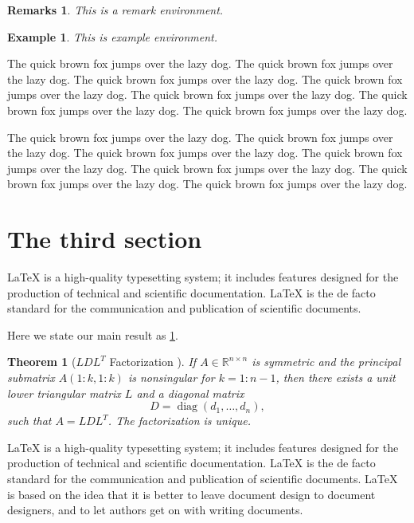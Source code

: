 \documentclass[openany,twoside,12pt]{book}
\theoremstyle{plain}
\newtheorem{theorem}{Theorem}[chapter]
\newtheorem{example}{Example}[chapter]
\newtheorem{remark}{Remarks}[chapter]
\numberwithin{equation}{chapter}
\numberwithin{figure}{chapter}
\numberwithin{table}{chapter}
\begin{document}
\begin{remark}
  This is a remark environment.
\end{remark}

\begin{example}
  This is example environment.
\end{example}

The quick brown fox jumps over the lazy dog. The quick brown fox jumps over the lazy dog. The quick brown fox jumps over the lazy dog. The quick brown fox jumps over the lazy dog. The quick brown fox jumps over the lazy dog. The quick brown fox jumps over the lazy dog. The quick brown fox jumps over the lazy dog.

The quick brown fox jumps over the lazy dog. The quick brown fox jumps over the lazy dog. The quick brown fox jumps over the lazy dog. The quick brown fox jumps over the lazy dog. The quick brown fox jumps over the lazy dog. The quick brown fox jumps over the lazy dog. The quick brown fox jumps over the lazy dog.


\section{The third section}
LaTeX is a high-quality typesetting system; it includes features designed for the production of technical and scientific documentation. LaTeX is the de facto standard for the communication and publication of scientific documents.

Here we state our main result as \ref{thm:bigthm}.

\begin{theorem}[$LDL^T$ Factorization \cite{GoVa2013}]\label{thm:bigthm}
  If $A \in \mathbb{R}^{n \times n}$ is symmetric and the principal
  submatrix $A(1:k,1:k)$ is nonsingular for $k=1:n-1$, then there
  exists a unit lower triangular matrix $L$ and a diagonal matrix
  \begin{equation*}
    D = \operatorname{diag}(d_1,\dots,d_n),  %
  \end{equation*}
  such that $A=LDL^T$. The factorization is unique.
\end{theorem}

LaTeX is a high-quality typesetting system; it includes features designed
for the production of technical and scientific documentation.
LaTeX is the de facto standard for the communication and publication of scientific documents.
LaTeX is based on the idea that it is better to leave document design to
document designers, and to let authors get on with writing documents.
\end{document}
